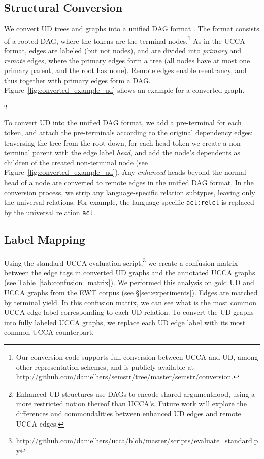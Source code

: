\documentclass[11pt,a4paper]{article}
\begin{document}
\subsection{Structural Conversion}\label{sec:structural}

We convert UD trees and graphs into a unified DAG format \cite{hershcovich2018multitask,hershcovich2018universal}.
The format consists of a rooted DAG, where the tokens are the terminal
nodes.\footnote{Our conversion code supports full conversion between UCCA and UD,
among other representation schemes,
and is publicly available at \url{http://github.com/danielhers/semstr/tree/master/semstr/conversion}.}
As in the UCCA format, edges are labeled (but not nodes),
and are divided into \textit{primary} and \textit{remote} edges,
where the primary edges form a tree (all nodes have at most one primary parent,
and the root has none).
Remote edges enable reentrancy, and thus together with primary edges
form a DAG.
Figure~\ref{fig:converted_example_ud} shows an example for a converted graph.

\footnote{Enhanced UD structures \cite{SCHUSTER16.779} use DAGs to encode
      shared argumenthood, using a more restricted notion thereof than UCCA's. Future work
      will explore the differences and commondalities between enhanced UD edges and remote UCCA edges.}

To convert UD into the unified DAG format,
we add a pre-terminal for each token,
and attach the pre-terminals according to the original dependency edges:
traversing the tree from the root down, for each head token we create a non-terminal
parent with the edge label {\it head},
and add the node's dependents as children of the created non-terminal node
(see Figure~\ref{fig:converted_example_ud}).
Any \textit{enhanced}
heads beyond the normal head of a node are converted to remote edges in the unified DAG format.
In the conversion process, we strip any language-specific relation subtypes,
leaving only the universal relations.
For example, the language-specific \verb|acl:relcl| is replaced by the universal relation \verb|acl|.



\subsection{Label Mapping}\label{sec:mapping}

Using the standard UCCA evaluation
script,\footnote{\url{http://github.com/danielhers/ucca/blob/master/scripts/evaluate_standard.py}}
we create a confusion matrix between the edge tags in converted UD graphs
and the annotated UCCA graphs (see Table~\ref{tab:confusion_matrix}).
We performed this analysis on gold UD and UCCA graphs from the EWT corpus (see \S\ref{sec:experiments}).
Edges are matched by terminal yield.
In this confusion matrix, we can see what is the most common UCCA edge label corresponding
to each UD relation.
To convert the UD graphs into fully labeled UCCA graphs,
we replace each UD edge label with its most common UCCA counterpart.
\end{document}

